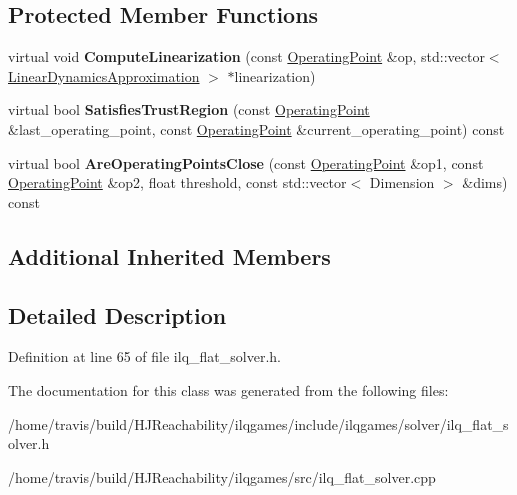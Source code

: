 \subsection*{Protected Member Functions}
\begin{DoxyCompactItemize}
\item 
virtual void {\bfseries Compute\+Linearization} (const \hyperlink{structilqgames_1_1_operating_point}{Operating\+Point} \&op, std\+::vector$<$ \hyperlink{structilqgames_1_1_linear_dynamics_approximation}{Linear\+Dynamics\+Approximation} $>$ $\ast$linearization)\hypertarget{classilqgames_1_1_i_l_q_flat_solver_abcaec1afcd87975d5d9af23bae154939}{}\label{classilqgames_1_1_i_l_q_flat_solver_abcaec1afcd87975d5d9af23bae154939}

\item 
virtual bool {\bfseries Satisfies\+Trust\+Region} (const \hyperlink{structilqgames_1_1_operating_point}{Operating\+Point} \&last\+\_\+operating\+\_\+point, const \hyperlink{structilqgames_1_1_operating_point}{Operating\+Point} \&current\+\_\+operating\+\_\+point) const \hypertarget{classilqgames_1_1_i_l_q_flat_solver_a0f9a32d7bb55ff8d44c6a34ecc2335ee}{}\label{classilqgames_1_1_i_l_q_flat_solver_a0f9a32d7bb55ff8d44c6a34ecc2335ee}

\item 
virtual bool {\bfseries Are\+Operating\+Points\+Close} (const \hyperlink{structilqgames_1_1_operating_point}{Operating\+Point} \&op1, const \hyperlink{structilqgames_1_1_operating_point}{Operating\+Point} \&op2, float threshold, const std\+::vector$<$ Dimension $>$ \&dims) const \hypertarget{classilqgames_1_1_i_l_q_flat_solver_a4b79c70958d7ac9eb19c8b95de8dc33a}{}\label{classilqgames_1_1_i_l_q_flat_solver_a4b79c70958d7ac9eb19c8b95de8dc33a}

\end{DoxyCompactItemize}
\subsection*{Additional Inherited Members}


\subsection{Detailed Description}


Definition at line 65 of file ilq\+\_\+flat\+\_\+solver.\+h.



The documentation for this class was generated from the following files\+:\begin{DoxyCompactItemize}
\item 
/home/travis/build/\+H\+J\+Reachability/ilqgames/include/ilqgames/solver/ilq\+\_\+flat\+\_\+solver.\+h\item 
/home/travis/build/\+H\+J\+Reachability/ilqgames/src/ilq\+\_\+flat\+\_\+solver.\+cpp\end{DoxyCompactItemize}
